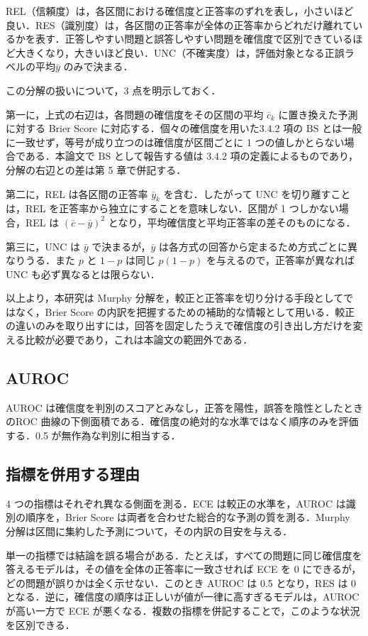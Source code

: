 REL（信頼度）は，各区間における確信度と正答率のずれを表し，小さいほど良い．RES（識別度）は，各区間の正答率が全体の正答率からどれだけ離れているかを表す．正答しやすい問題と誤答しやすい問題を確信度で区別できているほど大きくなり，大きいほど良い．UNC（不確実度）は，評価対象となる正誤ラベルの平均$\bar{y}$ のみで決まる．

この分解の扱いについて，3 点を明示しておく．

第一に，上式の右辺は，各問題の確信度をその区間の平均 $\bar{c}_k$ に置き換えた予測に対する Brier Score に対応する．個々の確信度を用いた3.4.2 項の $\mathrm{BS}$ とは一般に一致せず，等号が成り立つのは確信度が区間ごとに 1 つの値しかとらない場合である．本論文で $\mathrm{BS}$ として報告する値は 3.4.2 項の定義によるものであり，分解の右辺との差は第 5 章で併記する．

第二に，REL は各区間の正答率 $\bar{y}_k$ を含む．したがって UNC を切り離すことは，REL を正答率から独立にすることを意味しない．区間が 1 つしかない場合，REL は $(\bar{c} - \bar{y})^2$ となり，平均確信度と平均正答率の差そのものになる．

第三に，UNC は $\bar{y}$ で決まるが，$\bar{y}$ は各方式の回答から定まるため方式ごとに異なりうる．また $p$ と $1-p$ は同じ $p(1-p)$ を与えるので，正答率が異なれば UNC も必ず異なるとは限らない．

以上より，本研究は Murphy 分解を，較正と正答率を切り分ける手段としてではなく，Brier Score の内訳を把握するための補助的な情報として用いる．較正の違いのみを取り出すには，回答を固定したうえで確信度の引き出し方だけを変える比較が必要であり，これは本論文の範囲外である．

\subsection{AUROC}

AUROC は確信度を判別のスコアとみなし，正答を陽性，誤答を陰性としたときのROC 曲線の下側面積である．確信度の絶対的な水準ではなく順序のみを評価する．0.5 が無作為な判別に相当する．

\subsection{指標を併用する理由}

4 つの指標はそれぞれ異なる側面を測る．ECE は較正の水準を，AUROC は識別の順序を，Brier Score は両者を合わせた総合的な予測の質を測る．Murphy 分解は区間に集約した予測について，その内訳の目安を与える．

単一の指標では結論を誤る場合がある．たとえば，すべての問題に同じ確信度を答えるモデルは，その値を全体の正答率に一致させれば ECE を 0 にできるが，どの問題が誤りかは全く示せない．このとき AUROC は 0.5 となり，RES は 0 となる．逆に，確信度の順序は正しいが値が一律に高すぎるモデルは，AUROC が高い一方で ECE が悪くなる．複数の指標を併記することで，このような状況を区別できる．

